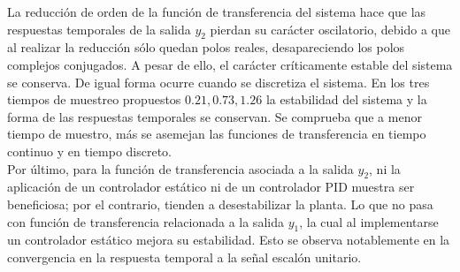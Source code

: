 \documentclass[journal]{IEEEtran}
\begin{document}
La reducción de orden de la función de transferencia del sistema hace que las respuestas temporales de la salida $y_2$ pierdan su carácter oscilatorio, debido a que al realizar la reducción sólo quedan polos reales, desapareciendo los polos complejos conjugados. A pesar de ello, el carácter críticamente estable del sistema se conserva. De igual forma ocurre cuando se discretiza el sistema. En los tres tiempos de muestreo propuestos $0.21, 0.73,1.26$ la estabilidad del sistema y la forma de las respuestas temporales se conservan. Se comprueba que a menor tiempo de muestro, más se asemejan las funciones de transferencia en tiempo continuo y en tiempo discreto.\\


Por último, para la función de transferencia asociada a la salida $y_2$, ni la aplicación de un controlador estático ni de un controlador PID muestra ser beneficiosa; por el contrario, tienden a desestabilizar la planta. Lo que no pasa con función de transferencia relacionada a la salida $y_1$, la cual al implementarse un controlador estático mejora su estabilidad. Esto se observa notablemente en la convergencia en la respuesta temporal a la señal escalón unitario.  





\newpage

\end{document}
